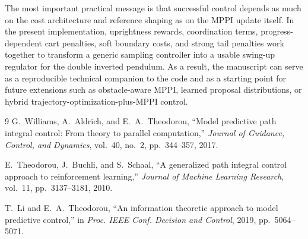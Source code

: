 \documentclass[conference]{IEEEtran}
\begin{document}
The most important practical message is that successful control depends as much on the cost architecture and reference shaping as on the MPPI update itself. In the present implementation, uprightness rewards, coordination terms, progress-dependent cart penalties, soft boundary costs, and strong tail penalties work together to transform a generic sampling controller into a usable swing-up regulator for the double inverted pendulum. As a result, the manuscript can serve as a reproducible technical companion to the code and as a starting point for future extensions such as obstacle-aware MPPI, learned proposal distributions, or hybrid trajectory-optimization-plus-MPPI control.


\begin{thebibliography}{9}
G.~Williams, A.~Aldrich, and E.~A.~Theodorou, ``Model predictive path integral control: From theory to parallel computation,'' \emph{Journal of Guidance, Control, and Dynamics}, vol.~40, no.~2, pp.~344--357, 2017.

E.~Theodorou, J.~Buchli, and S.~Schaal, ``A generalized path integral control approach to reinforcement learning,'' \emph{Journal of Machine Learning Research}, vol.~11, pp.~3137--3181, 2010.

T.~Li and E.~A.~Theodorou, ``An information theoretic approach to model predictive control,'' in \emph{Proc. IEEE Conf. Decision and Control}, 2019, pp.~5064--5071.
\end{thebibliography}
\end{document}
